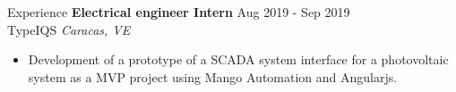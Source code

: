 \documentclass{resume} %
\begin{document}
\begin{rSection}{Experience}
    \textbf{Electrical engineer Intern} \hfill Aug 2019 - Sep 2019\\
    TypeIQS \hfill \textit{Caracas, VE}
    \begin{itemize}

        \item Development of a prototype of a SCADA system interface for a 
        photovoltaic system as a MVP project using Mango Automation and Angularjs.

    \end{itemize}







\end{rSection}



\end{document}
